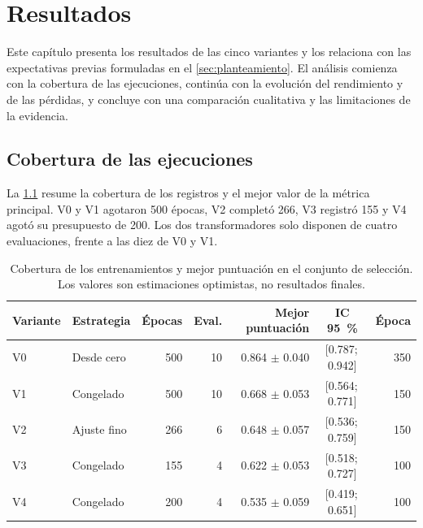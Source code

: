 \chapter{Resultados}
\label{cap:resultados}

Este cap\'itulo presenta los resultados de las cinco variantes y los relaciona con las
expectativas previas formuladas en el \cref{sec:planteamiento}. El an\'alisis comienza con la
cobertura de las ejecuciones, contin\'ua con la evoluci\'on del rendimiento y de las
p\'erdidas, y concluye con una comparaci\'on cualitativa y las limitaciones de la evidencia.

\section{Cobertura de las ejecuciones}
\label{sec:cobertura-resultados}

La \cref{tab:resultados} resume la cobertura de los registros y el mejor valor de la
m\'etrica principal. V0 y V1 agotaron \num{500} \'epocas, V2 complet\'o \num{266}, V3
registr\'o \num{155} y V4 agot\'o su presupuesto de \num{200}. Los dos transformadores
solo disponen de cuatro evaluaciones, frente a las diez de V0 y V1.

\begin{table}[htbp]
  \centering
  \caption{Cobertura de los entrenamientos y mejor puntuaci\'on en el conjunto de
    selecci\'on. Los valores son estimaciones optimistas, no resultados finales.}
  \label{tab:resultados}
  \small
  \begin{tabular}{llrrrcr}
    \toprule
    Variante & Estrategia & \'Epocas & Eval. & Mejor puntuaci\'on & IC \SI{95}{\percent} &
      \'Epoca \\
    \midrule
    V0 & Desde cero  & \num{500} & \num{10} & \num{0.864} $\pm$ \num{0.040} &
      {[\num{0.787};\,\num{0.942}]} & \num{350} \\
    V1 & Congelado   & \num{500} & \num{10} & \num{0.668} $\pm$ \num{0.053} &
      {[\num{0.564};\,\num{0.771}]} & \num{150} \\
    V2 & Ajuste fino & \num{266} & \num{6}  & \num{0.648} $\pm$ \num{0.057} &
      {[\num{0.536};\,\num{0.759}]} & \num{150} \\
    V3 & Congelado   & \num{155} & \num{4}  & \num{0.622} $\pm$ \num{0.053} &
      {[\num{0.518};\,\num{0.727}]} & \num{100} \\
    V4 & Congelado   & \num{200} & \num{4}  & \num{0.535} $\pm$ \num{0.059} &
      {[\num{0.419};\,\num{0.651}]} & \num{100} \\
    \bottomrule
  \end{tabular}
\end{table}

